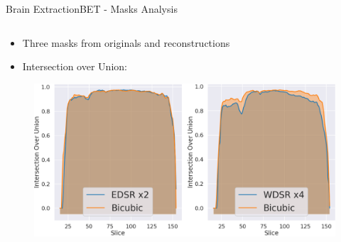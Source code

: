 \documentclass[10pt, unicode]{beamer}
\begin{document}
\begin{frame}{Brain Extraction}{BET - Masks Analysis}

  \begin{columns}
    \begin{column}{0.5\textwidth}
      \hspace{2cm}
      \begin{itemize}
        \item  Three masks from originals and reconstructions
        \item  Intersection over Union: 
      \end{itemize}
      
      \vspace{0.2cm}
      \begin{figure}
        \includegraphics[scale=0.14]{./images/iou_scores.png}
      \end{figure}
    \end{column}


\end{columns}
\end{frame}
\end{document}
